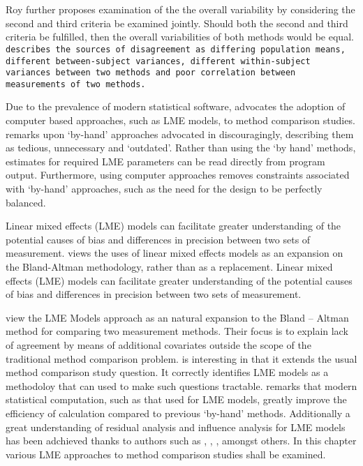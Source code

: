 \documentclass[12pt, a4paper]{report}
\theoremstyle{plain}
\theoremstyle{definition}
\theoremstyle{remark}
\begin{document}
	Roy further proposes examination of the the overall variability by considering the second and third criteria be examined jointly. Should both the second and third criteria be fulfilled, then the overall variabilities of both methods would be equal.
	\texttt{\citet{Barnhart}  describes the sources of disagreement as
		differing population means, different between-subject variances,
		different within-subject variances between two methods and poor
		correlation between measurements of two methods.	}

			Due to the prevalence of modern statistical software, \citet{BXC2008} advocates the adoption of computer based approaches, such as LME models, to method comparison studies. \citet{BXC2008} remarks upon `by-hand' approaches advocated in \citet{BA99} discouragingly, describing them as tedious, unnecessary and `outdated'. Rather than using the `by hand' methods, estimates for required LME parameters can be read directly from program output. Furthermore, using computer approaches removes constraints associated with `by-hand' approaches, such as the need for the design to be perfectly balanced.
			
			
		Linear mixed effects (LME) models can facilitate greater
		understanding of the potential causes of bias and differences in
		precision between two sets of measurement. \citet{LaiShiao} views
		the uses of linear mixed effects models as an expansion on the
		Bland-Altman methodology, rather than as a replacement.
		Linear mixed effects (LME) models can facilitate greater understanding of the potential causes of bias and differences in precision between two sets of measurement.
		
		 \citet{LaiShiao} view the LME Models approach as an natural expansion to the Bland – Altman method for comparing two measurement methods. Their focus is to explain lack of agreement by means of additional covariates outside the scope of the traditional method comparison problem. \citet{LaiShiao} is interesting in that it extends the usual method comparison study question. It correctly identifies LME models as a methodoloy that can used to make such questions tractable.	\citet{BXC2008} remarks that modern statistical computation, such as that used for LME models, greatly improve the efficiency of
		calculation compared to previous `by-hand' methods. Additionally a great understanding of residual analysis and influence analysis for LME models has been adchieved thanks to authors such as \citet{schab}, \citet{CPJ}, \citet{cook86} \citet{west}, amongst others. In this chapter various LME approaches to method comparison studies shall
		be examined. 
		
\end{document}
